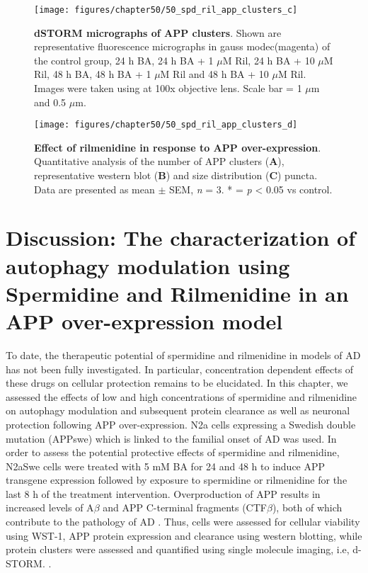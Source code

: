 \begin{landscape}
\begin{figure}[!htbp]
\center
  \texttt{[image: figures/chapter50/50\_spd\_ril\_app\_clusters\_c]}
  \caption[dSTORM micrographs of APP clusters]{\textbf{dSTORM micrographs of APP clusters}. Shown are representative fluorescence micrographs in gauss modec(magenta) of the control group, 24 h BA, 24 h BA + 1 $\mu$M Ril, 24 h BA + 10 $\mu$M Ril, 48 h BA, 48 h BA + 1 $\mu$M Ril and 48 h BA + 10 $\mu$M Ril. Images were taken using at 100x objective lens. Scale bar = 1 $\mu$m and 0.5 $\mu$m.}
  \label{fig:50_spd_ril_app_clusters_c}
\end{figure} 
\end{landscape}

\begin{landscape}
\begin{figure}[!htbp]
\center
  \texttt{[image: figures/chapter50/50\_spd\_ril\_app\_clusters\_d]}
  \caption[Effect of rilmenidine in response to APP over-expression]{\textbf{Effect of rilmenidine in response to APP over-expression}. Quantitative analysis of the number of APP clusters (\textbf{A}), representative western blot (\textbf{B}) and size distribution (\textbf{C}) puncta. Data are presented as mean $\pm$ SEM, \textit{n} = 3. * = \textit{p} < 0.05 vs control.}
  \label{fig:50_spd_ril_app_clusters_d}
\end{figure} 
\end{landscape}

\section{Discussion: The characterization of autophagy modulation using Spermidine and Rilmenidine in an APP over-expression model}
To date, the therapeutic potential of spermidine and rilmenidine in models of AD has not been fully investigated. In particular, concentration dependent effects of these drugs on cellular protection remains to be elucidated. In this chapter, we assessed the effects of low and high concentrations of spermidine and rilmenidine on autophagy modulation and subsequent protein clearance as well as neuronal protection following APP over-expression. N2a cells expressing a Swedish double mutation (APPswe) which is linked to the familial onset of AD was used. In order to assess the potential protective effects of spermidine and rilmenidine, N2aSwe cells were treated with 5 mM BA for 24 and 48 h to induce APP transgene expression \citep{Sisodia1990,Lo1994} followed by exposure to spermidine or rilmenidine for the last 8 h of the treatment intervention. Overproduction of APP results in increased levels of A$\beta$ and APP C-terminal fragments (CTF$\beta$), both of which contribute to the pathology of AD \citep{Walsh2007}. Thus, cells were assessed for cellular viability using WST-1, APP protein expression and clearance using western blotting, while protein clusters were assessed and quantified using single molecule imaging, i.e, d-STORM.
.
